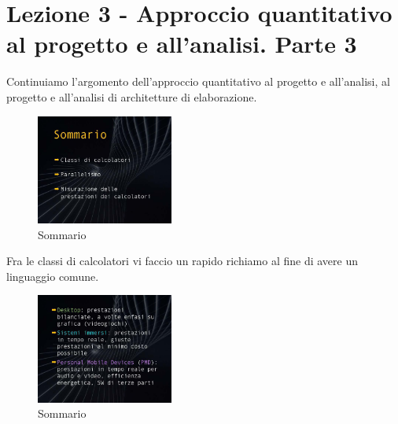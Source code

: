 \chapter{Lezione 3 - Approccio quantitativo al progetto e all'analisi. Parte 3}

Continuiamo l'argomento dell'approccio quantitativo al progetto e all'analisi, al progetto e all'analisi di architetture di elaborazione.

\FloatBarrier
\begin{figure}[H]
  \centering
  \includegraphics[width=0.40\textwidth,
                    trim=40 80 10 40, %
                    clip]
                    {images/Lez03_p01_fig_02.png}
  \caption{Sommario}
  \label{fig:Lez03_p01_fig_02}
\end{figure}
\FloatBarrier
\noindent

Fra le classi di calcolatori vi faccio un rapido richiamo al fine di avere un linguaggio comune.

\FloatBarrier
\begin{figure}[H]
  \centering
  \includegraphics[width=0.40\textwidth,
                    trim=40 50 10 40, %
                    clip]
                    {images/Lez03_p01_fig_04.png}
  \caption{Sommario}
  \label{fig:Lez03_p01_fig_04}
\end{figure}
\FloatBarrier
\noindent

